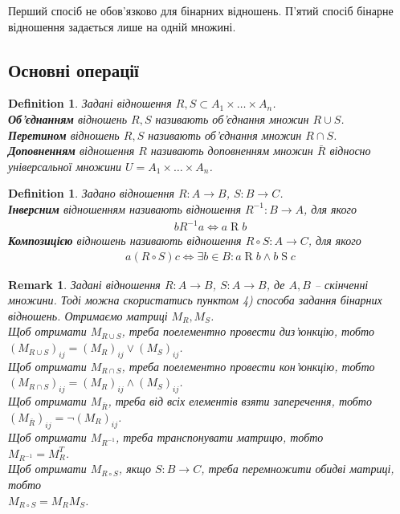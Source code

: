 \documentclass[a4paper, 14pt]{extarticle}
\theoremstyle{theoremdd}
\theoremstyle{theoremdd}
\newtheorem{definition}[theorem]{Definition}
\theoremstyle{theoremdd}
\theoremstyle{theoremdd}
\theoremstyle{theoremdd}
\theoremstyle{theoremdd}
\theoremstyle{theoremdd}
\theoremstyle{theoremdd}
\theoremstyle{theoremdd}
\theoremstyle{theoremdd}
\theoremstyle{theoremdd}
\newtheorem{remark}[theorem]{Remark}
\theoremstyle{theoremdd}
\theoremstyle{theoremdd}
\theoremstyle{theoremdd}
\theoremstyle{theoremdd}
\begin{document}
Перший спосіб не обов'язково для бінарних відношень. П'ятий спосіб бінарне відношення задається лише на одній множині.

\subsection{Основні операції}
\begin{definition}
Задані відношення $R,S \subset A_1 \times \dots \times A_n$.\\
\textbf{Об'єднанням} відношень $R,S$ називають об'єднання множин $R \cup S$.\\
\textbf{Перетином} відношень $R,S$ називають об'єднання множин $R \cap S$.\\
\textbf{Доповненням} відношення $R$ називають доповненням множин $\bar{R}$ відносно універсальної множини $U = A_1 \times \dots \times A_n$.
\end{definition}

\begin{definition}
Задано відношення $R \colon A \to B$, $S \colon B \to C$. \\
\textbf{Інверсним} відношенням називають відношення $R^{-1} \colon B \to A$, для якого
\begin{align*}
b \mathrel{R^{-1}} a \iff a \mathrel{R} b
\end{align*}
\textbf{Композицією} відношень називають відношення $R \circ S \colon A \to C$, для якого
\begin{align*}
a\mathrel{(R \circ S)}c \iff \exists b \in B: a \mathrel{R} b \wedge b\mathrel{S} c
\end{align*}
\end{definition}

\begin{remark}
Задані відношення $R \colon A \to B$, $S \colon A \to B$, де $A,B$ -- скінченні множини. Тоді можна скористатись пунктом 4) способа задання бінарних відношень. Отримаємо матриці $M_R, M_S$.\\
Щоб отримати $M_{R \cup S}$, треба поелементно провести диз'юнкцію, тобто \\ $(M_{R \cup S})_{ij} = (M_R)_{ij} \vee (M_S)_{ij}$.\\
Щоб отримати $M_{R \cap S}$, треба поелементно провести кон'юнкцію, тобто \\ $(M_{R \cap S})_{ij} = (M_R)_{ij} \wedge (M_S)_{ij}$.\\
Щоб отримати $M_{\bar{R}}$, треба від всіх елементів взяти заперечення, тобто \\ $(M_{\bar{R}})_{ij} = \neg (M_R)_{ij}$.\\
Щоб отримати $M_{R^{-1}}$, треба транспонувати матрицю, тобто \\ $M_{R^{-1}} = M_R^T$.\\
Щоб отримати $M_{R \circ S}$, якщо $S \colon B \to C$, треба перемножити обидві матриці, тобто \\ $M_{R \circ S} = M_R M_S$.
\end{remark}
\end{document}
